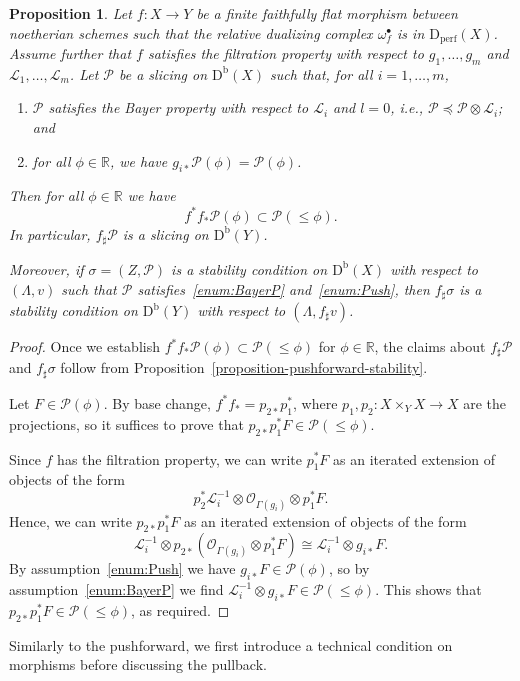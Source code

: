 \documentclass[11pt, reqno]{amsart}
\numberwithin{equation}{section}
\theoremstyle{plain}
\newtheorem{proposition}[theorem]{Proposition}
\theoremstyle{remark}
\theoremstyle{definition}
\theoremstyle{italicsname}
\newcommand{\Db}{\mathrm{D^b}}
\newcommand{\Dperf}{\mathrm{D}_{\mathrm{perf}}}
\newcommand{\cO}{\mathcal{O}}
\newcommand{\cL}{\mathcal{L}}
\newcommand{\cP}{\mathscr{P}}
\def\RR{\ensuremath{\mathbb{R}}}
\begin{document}
\begin{proposition}\label{prop:PushforwardStability}
Let $f\colon X\to Y$ be a finite faithfully flat morphism between noetherian schemes  such that the relative dualizing complex $\omega_f^\bullet$ is in $\Dperf(X)$. 
Assume further that $f$ satisfies the filtration property with respect to $g_1,\dots,g_m$ and $\cL_1,\dots,\cL_m$. 
Let $\cP$ be a slicing on $\Db(X)$ such that, for all $i=1,\dots,m$, 
\begin{enumerate}[{\rm (i)}]
\item\label{enum:BayerP} $\cP$ satisfies the Bayer property with respect to $\cL_i$ and $l=0$, i.e., $\cP\preceq\cP\otimes\cL_i$; and 
\item\label{enum:Push} for all $\phi \in \RR$, we have $g_{i*}\cP(\phi) = \cP(\phi)$.
\end{enumerate}
Then for all $\phi\in\RR$ we have 
\[
f^*f_*\cP(\phi) \subset \cP(\leq\phi).
\]
In particular, $f_\sharp\cP$ is a slicing on $\Db(Y)$.

Moreover, if $\sigma=(Z,\cP)$ is a stability condition on $\Db(X)$ with respect to $(\Lambda,v)$ such that $\cP$ satisfies~\ref{enum:BayerP} and~\ref{enum:Push}, then $f_\sharp\sigma$ is a stability condition on $\Db(Y)$ with respect to $(\Lambda,f_\sharp v)$.
\end{proposition}

\begin{proof}
Once we establish $f^*f_*\cP(\phi) \subset \cP(\leq \phi)$ for $\phi \in \RR$, the claims about $f_{\sharp}\cP$ and $f_{\sharp} \sigma$ follow from Proposition~\ref{proposition-pushforward-stability}. 

Let $F\in\cP(\phi)$. 
By base change, $f^*f_*=p_{2*}p_1^*$, where $p_1,p_2\colon X\times_Y X\to X$ are the projections, so it suffices to prove that $p_{2*}p_1^*F \in \cP(\leq \phi)$. 

Since $f$ has the filtration property, we can write $p_1^*F$ as an iterated extension of objects of the form
\[
p_2^*\cL_i^{-1}\otimes\cO_{\Gamma(g_i)}\otimes p_1^*F.
\]
Hence, we can write $p_{2*}p_1^*F$ as an iterated extension of objects of the form
\[
\cL_i^{-1}\otimes p_{2*}\left(\cO_{\Gamma(g_i)}\otimes p_1^*F\right)\cong\cL_i^{-1}\otimes g_{i*}F.
\]
By assumption~\ref{enum:Push} we have $g_{i*}F\in\cP(\phi)$, so by assumption~\ref{enum:BayerP} we find $\cL_i^{-1}\otimes g_{i*}F\in\cP(\leq\phi)$. 
This shows that $p_{2*}p_1^*F \in \cP(\leq \phi)$, as required. 
\end{proof}

Similarly to the pushforward, we first introduce a technical condition on morphisms before discussing the pullback.
\end{document}
